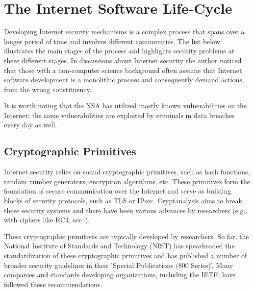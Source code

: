 \documentclass[peerreview, a4paper, 7pt]{IEEEtran}
\begin{document}

\section[The Internet Software Life-Cycle]{The Internet Software Life-Cycle}
\label{cycle} 
Developing Internet security mechanisms is a complex process that spans over a longer period of time and involves different communities. The list below illustrates the main stages of the process and highlights security problems at these different stages. In discussions about Internet security the author noticed that those with a non-computer science background often assume that Internet software development is a monolithic process and consequently demand actions from the wrong constituency.

It is worth noting that the NSA has utilized mostly known vulnerabilities on the Internet; the same vulnerabilities are exploited by criminals in data breaches every day as well. 

\subsection{Cryptographic Primitives}

Internet security relies on sound cryptographic primitives, such as hash functions, random number generators, encryption algorithms, etc. These primitives form the foundation of secure communication over the Internet and serve as building blocks of security protocols, such as TLS or IPsec. Cryptanalysis aims to break these security systems and there have been various advances by researchers (e.g., with ciphers like RC4, see~\cite{RC4, RC4-TLS}).

These cryptographic primitives are typically developed by researchers. So far, the National Institute of Standards and Technology (NIST) has spearheaded the standardization of these cryptographic primitives and has published a number of broader security guidelines in their 'Special Publications (800 Series)'. Many companies and standards developing organizations, including the IETF, have followed these recommendations.



\end{document}
